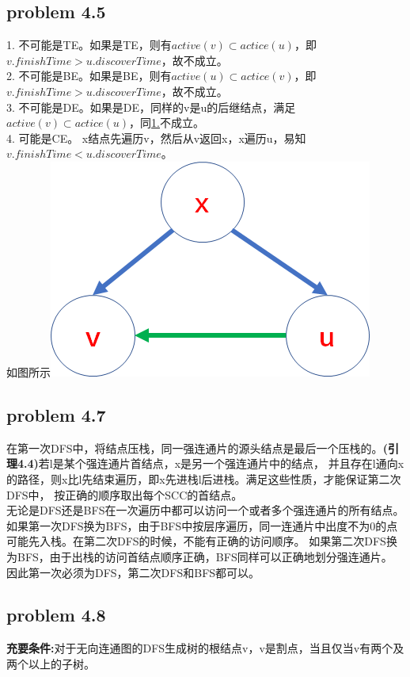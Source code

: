 \documentclass[11pt,a4paper,oneside,oldfontcommands]{ctexart}
\begin{document}
{\subsection*{problem 4.5}}
\noindent \hypertarget{1.}{1. }不可能是TE。如果是TE，则有$active(v)\subset actice(u)$，即$v.finishTime>u.discoverTime$，故不成立。\\
2. 不可能是BE。如果是BE，则有$active(u)\subset actice(v)$，即$v.finishTime>u.discoverTime$，故不成立。\\
3. 不可能是DE。如果是DE，同样的v是u的后继结点，满足$active(v)\subset actice(u)$，同\hyperref[1.]{1.}不成立。\\
4. 可能是CE。
x结点先遍历v，然后从v返回x，x遍历u，易知$v.finishTime<u.discoverTime$。\\
如图所示\includegraphics{CEORDER.png}\\
\newpage
{\subsection*{problem 4.7}}
在第一次DFS中，将结点压栈，同一强连通片的源头结点是最后一个压栈的。\textbf{(引理4.4)}若l是某个强连通片首结点，x是另一个强连通片中的结点，
并且存在l通向x的路径，则x比l先结束遍历，即x先进栈l后进栈。满足这些性质，才能保证第二次DFS中，
按正确的顺序取出每个SCC的首结点。\\
\hspace*{20pt}无论是DFS还是BFS在一次遍历中都可以访问一个或者多个强连通片的所有结点。\\
\hspace*{20pt}如果第一次DFS换为BFS，由于BFS中按层序遍历，同一连通片中出度不为0的点可能先入栈。在第二次DFS的时候，不能有正确的访问顺序。
\hspace*{20pt}如果第二次DFS换为BFS，由于出栈的访问首结点顺序正确，BFS同样可以正确地划分强连通片。\\
\hspace*{20pt}因此第一次必须为DFS，第二次DFS和BFS都可以。
{\subsection*{problem 4.8}}
\noindent\textbf{充要条件:}对于无向连通图的DFS生成树的根结点v，v是割点，当且仅当v有两个及两个以上的子树。
\end{document}
